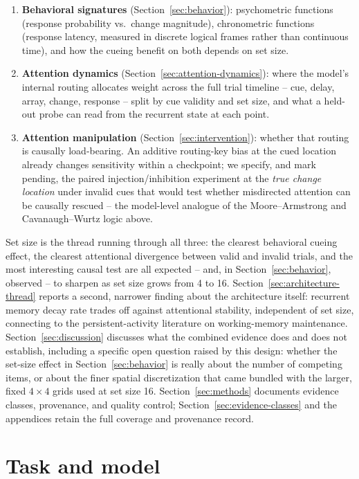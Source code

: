 \documentclass[11pt,a4paper]{article}
\begin{document}
\begin{enumerate}
\item \textbf{Behavioral signatures} (Section~\ref{sec:behavior}): psychometric functions (response probability vs.\ change magnitude), chronometric functions (response latency, measured in discrete logical frames rather than continuous time), and how the cueing benefit on both depends on set size.
\item \textbf{Attention dynamics} (Section~\ref{sec:attention-dynamics}): where the model's internal routing allocates weight across the full trial timeline -- cue, delay, array, change, response -- split by cue validity and set size, and what a held-out probe can read from the recurrent state at each point.
\item \textbf{Attention manipulation} (Section~\ref{sec:intervention}): whether that routing is causally load-bearing. An additive routing-key bias at the cued location already changes sensitivity within a checkpoint; we specify, and mark pending, the paired injection/inhibition experiment at the \emph{true change location} under invalid cues that would test whether misdirected attention can be causally rescued -- the model-level analogue of the Moore--Armstrong and Cavanaugh--Wurtz logic above.
\end{enumerate}

Set size is the thread running through all three: the clearest behavioral cueing effect, the clearest attentional divergence between valid and invalid trials, and the most interesting causal test are all expected -- and, in Section~\ref{sec:behavior}, observed -- to sharpen as set size grows from 4 to 16. Section~\ref{sec:architecture-thread} reports a second, narrower finding about the architecture itself: recurrent memory decay rate trades off against attentional stability, independent of set size, connecting to the persistent-activity literature on working-memory maintenance. Section~\ref{sec:discussion} discusses what the combined evidence does and does not establish, including a specific open question raised by this design: whether the set-size effect in Section~\ref{sec:behavior} is really about the number of competing items, or about the finer spatial discretization that came bundled with the larger, fixed $4\times4$ grids used at set size 16. Section~\ref{sec:methods} documents evidence classes, provenance, and quality control; Section~\ref{sec:evidence-classes} and the appendices retain the full coverage and provenance record.

\section{Task and model}\label{sec:task-model}
\end{document}
